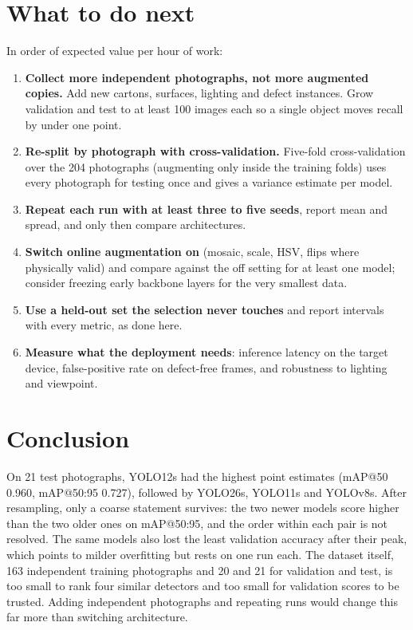 \documentclass[11pt,a4paper]{article}
\begin{document}
\section{What to do next}\label{sec:next}
In order of expected value per hour of work:
\begin{enumerate}[leftmargin=1.4em,itemsep=2pt]
  \item \textbf{Collect more independent photographs, not more augmented copies.} Add new cartons, surfaces, lighting and defect instances. Grow validation and test to at least 100 images each so a single object moves recall by under one point.
  \item \textbf{Re-split by photograph with cross-validation.} Five-fold cross-validation over the 204 photographs (augmenting only inside the training folds) uses every photograph for testing once and gives a variance estimate per model.
  \item \textbf{Repeat each run with at least three to five seeds}, report mean and spread, and only then compare architectures.
  \item \textbf{Switch online augmentation on} (mosaic, scale, HSV, flips where physically valid) and compare against the off setting for at least one model; consider freezing early backbone layers for the very smallest data.
  \item \textbf{Use a held-out set the selection never touches} and report intervals with every metric, as done here.
  \item \textbf{Measure what the deployment needs}: inference latency on the target device, false-positive rate on defect-free frames, and robustness to lighting and viewpoint.
\end{enumerate}

\section{Conclusion}
On 21 test photographs, YOLO12s had the highest point estimates (mAP@50 0.960, mAP@50:95 0.727), followed by YOLO26s, YOLO11s and YOLOv8s. After resampling, only a coarse statement survives: the two newer models score higher than the two older ones on mAP@50:95, and the order within each pair is not resolved. The same models also lost the least validation accuracy after their peak, which points to milder overfitting but rests on one run each. The dataset itself, 163 independent training photographs and 20 and 21 for validation and test, is too small to rank four similar detectors and too small for validation scores to be trusted. Adding independent photographs and repeating runs would change this far more than switching architecture.
\end{document}
